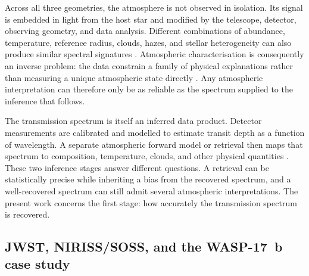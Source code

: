 Across all three geometries, the atmosphere is not observed in isolation. Its
signal is embedded in light from the host star and modified by the telescope,
detector, observing geometry, and data analysis. Different combinations of
abundance, temperature, reference radius, clouds, hazes, and stellar
heterogeneity can also produce similar spectral signatures
\citep{RackhamEtAl2018,Madhusudhan2019}. Atmospheric characterisation is
consequently an inverse problem: the data constrain a family of physical
explanations rather than measuring a unique atmospheric state directly
\citep{BarstowHeng2020}. Any atmospheric interpretation can therefore only be
as reliable as the spectrum supplied to the inference that follows.


The transmission spectrum is itself an inferred data product. Detector
measurements are calibrated and modelled to estimate transit depth as a function
of wavelength. A separate atmospheric forward model or retrieval then maps that
spectrum to composition, temperature, clouds, and other physical quantities
\citep{Brown2001,Madhusudhan2019}.
These two inference stages answer different questions. A retrieval can be
statistically precise while inheriting a bias from the recovered spectrum, and
a well-recovered spectrum can still admit several atmospheric interpretations.
The present work concerns the first stage: how accurately the transmission
spectrum is recovered.

\subsection{JWST, NIRISS/SOSS, and the WASP-17~b case study}
\label{sec:jwst-soss-wasp17}
\label{sec:arecibo-to-jwst}
\label{sec:soss-wasp17}


